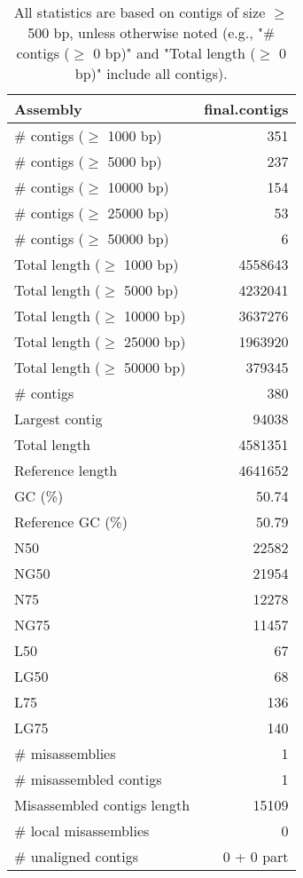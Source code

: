 \documentclass[12pt,a4paper]{article}
\begin{document}
\begin{table}[ht]
\begin{center}
\caption{All statistics are based on contigs of size $\geq$ 500 bp, unless otherwise noted (e.g., "\# contigs ($\geq$ 0 bp)" and "Total length ($\geq$ 0 bp)" include all contigs).}
\begin{tabular}{|l*{1}{|r}|}
\hline
Assembly & final.contigs \\ \hline
\# contigs ($\geq$ 1000 bp) & 351 \\ \hline
\# contigs ($\geq$ 5000 bp) & 237 \\ \hline
\# contigs ($\geq$ 10000 bp) & 154 \\ \hline
\# contigs ($\geq$ 25000 bp) & 53 \\ \hline
\# contigs ($\geq$ 50000 bp) & 6 \\ \hline
Total length ($\geq$ 1000 bp) & 4558643 \\ \hline
Total length ($\geq$ 5000 bp) & 4232041 \\ \hline
Total length ($\geq$ 10000 bp) & 3637276 \\ \hline
Total length ($\geq$ 25000 bp) & 1963920 \\ \hline
Total length ($\geq$ 50000 bp) & 379345 \\ \hline
\# contigs & 380 \\ \hline
Largest contig & 94038 \\ \hline
Total length & 4581351 \\ \hline
Reference length & 4641652 \\ \hline
GC (\%) & 50.74 \\ \hline
Reference GC (\%) & 50.79 \\ \hline
N50 & 22582 \\ \hline
NG50 & 21954 \\ \hline
N75 & 12278 \\ \hline
NG75 & 11457 \\ \hline
L50 & 67 \\ \hline
LG50 & 68 \\ \hline
L75 & 136 \\ \hline
LG75 & 140 \\ \hline
\# misassemblies & 1 \\ \hline
\# misassembled contigs & 1 \\ \hline
Misassembled contigs length & 15109 \\ \hline
\# local misassemblies & 0 \\ \hline
\# unaligned contigs & 0 + 0 part \\ \hline

\end{tabular}
\end{center}
\end{table}
\end{document}
